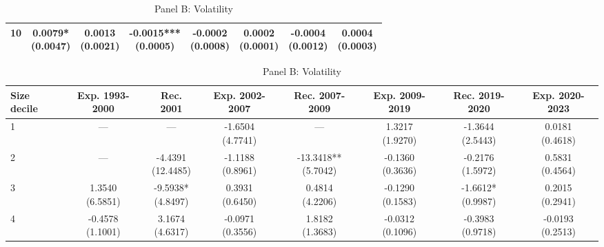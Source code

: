 \begin{table}[!htbp]
\begin{threeparttable}
\begin{subtable}[t]{\textwidth}
\begin{tabular}{@{}lccccccc@{}}
10 & \shortstack{0.0079*\\(0.0047)} & \shortstack{0.0013\\(0.0021)} & \shortstack{-0.0015***\\(0.0005)} & \shortstack{-0.0002\\(0.0008)} & \shortstack{0.0002\\(0.0001)} & \shortstack{-0.0004\\(0.0012)} & \shortstack{0.0004\\(0.0003)} \\
\bottomrule
\end{tabular}
\end{subtable}
\vspace{0.45em}
\begin{subtable}[t]{\textwidth}
\caption{Panel B: Volatility}
\centering
\begin{tabular}{@{}lccccccc@{}}
\toprule
Size decile & Exp. 1993-2000 & Rec. 2001 & Exp. 2002-2007 & Rec. 2007-2009 & Exp. 2009-2019 & Rec. 2019-2020 & Exp. 2020-2023 \\
\midrule
1 & — & — & \shortstack{-1.6504\\(4.7741)} & — & \shortstack{1.3217\\(1.9270)} & \shortstack{-1.3644\\(2.5443)} & \shortstack{0.0181\\(0.4618)} \\
2 & — & \shortstack{-4.4391\\(12.4485)} & \shortstack{-1.1188\\(0.8961)} & \shortstack{-13.3418**\\(5.7042)} & \shortstack{-0.1360\\(0.3636)} & \shortstack{-0.2176\\(1.5972)} & \shortstack{0.5831\\(0.4564)} \\
3 & \shortstack{1.3540\\(6.5851)} & \shortstack{-9.5938*\\(4.8497)} & \shortstack{0.3931\\(0.6450)} & \shortstack{0.4814\\(4.2206)} & \shortstack{-0.1290\\(0.1583)} & \shortstack{-1.6612*\\(0.9987)} & \shortstack{0.2015\\(0.2941)} \\
4 & \shortstack{-0.4578\\(1.1001)} & \shortstack{3.1674\\(4.6317)} & \shortstack{-0.0971\\(0.3556)} & \shortstack{1.8182\\(1.3683)} & \shortstack{-0.0312\\(0.1096)} & \shortstack{-0.3983\\(0.9718)} & \shortstack{-0.0193\\(0.2513)} \\

\end{tabular}
\end{subtable}
\end{threeparttable}
\end{table}
